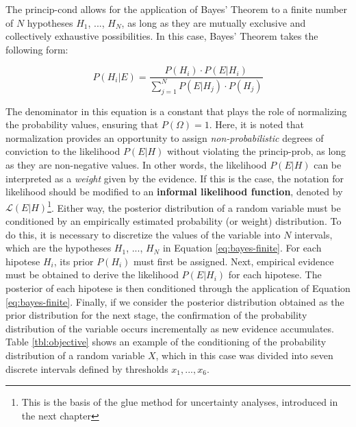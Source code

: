 \documentclass[./main_en.tex]{subfiles}
\begin{document}
\par The \gls{princip-cond} allows for the application of Bayes' Theorem to a finite number of $N$ hypotheses $H_1$, ..., $H_N$, as long as they are mutually exclusive and collectively exhaustive possibilities. In this case, Bayes' Theorem takes the following form:
\begin{linenomath*}
\begin{equation}
\label{eq:bayes-finite}
    P(H_i | E) = \frac{P(H_i) \cdot P(E | H_i)}{\sum_{j=1}^{N}P(E | H_j) \cdot P(H_j)}
\end{equation}
\end{linenomath*}
The denominator in this equation is a constant that plays the role of normalizing the probability values, ensuring that $P(\Omega) = 1$. Here, it is noted that normalization provides an opportunity to assign \textit{non-probabilistic} degrees of conviction to the \gls{likelihood} $P(E | H)$ without violating the \gls{princip-prob}, as long as they are non-negative values. In other words, the \gls{likelihood} $P(E | H)$ can be interpreted as a \textit{weight} given by the evidence. If this is the case, the notation for \gls{likelihood} should be modified to an \textbf{informal \gls{likelihood} function}, denoted by $\mathcal{L}(E|H)$\footnote{This is the basis of the \acrfull{glue} method for uncertainty analyses, introduced in the next chapter}. Either way, the posterior distribution of a random variable must be conditioned by an empirically estimated probability (or weight) distribution. To do this, it is necessary to discretize the values of the variable into $N$ intervals, which are the hypotheses $H_1$, ..., $H_N$ in Equation \eqref{eq:bayes-finite}. For each \gls{hipotese} $H_i$, its \gls{prior} $P(H_i)$ must first be assigned. Next, empirical evidence must be obtained to derive the \gls{likelihood} $P(E | H_i)$ for each \gls{hipotese}. The \gls{posterior} of each \gls{hipotese} is then conditioned through the application of Equation \eqref{eq:bayes-finite}. Finally, if we consider the posterior distribution obtained as the prior distribution for the next stage, the confirmation of the probability distribution of the variable occurs incrementally as new evidence accumulates. Table \ref{tbl:objective} shows an example of the \gls{conditioning} of the probability distribution of a random variable $X$, which in this case was divided into seven discrete intervals defined by thresholds $x_1, ..., x_6$.
\end{document}
